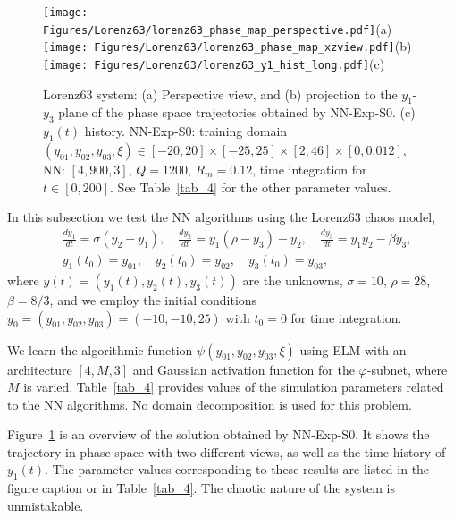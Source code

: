 \begin{figure}
  \centerline{
    \texttt{[image: Figures/Lorenz63/lorenz63\_phase\_map\_perspective.pdf]}(a)
    \texttt{[image: Figures/Lorenz63/lorenz63\_phase\_map\_xzview.pdf]}(b)
    \texttt{[image: Figures/Lorenz63/lorenz63\_y1\_hist\_long.pdf]}(c)
  }
  \caption{Lorenz63 system: (a) Perspective view, and (b) projection to the
    $y_1$-$y_3$ plane
    of the phase space trajectories obtained by NN-Exp-S0.
    (c) $y_1(t)$ history.
    NN-Exp-S0: training domain
    $(y_{01},y_{02},y_{03},\xi)\in[-20,20]\times[-25,25]\times[2,46]\times[0,0.012]$,
    NN: $[4,900,3]$, $Q=1200$, $R_m=0.12$, time integration for $t\in[0,200]$.
    See Table~\ref{tab_4} for the other parameter values.
  }
  \label{fg_21}
\end{figure}


In this subsection we test the NN algorithms using the Lorenz63 chaos model,
\begin{subequations}
\begin{align}
  & \frac{dy_1}{dt} = \sigma (y_2-y_1),\quad
   \frac{dy_2}{dt} = y_1(\rho-y_3) - y_2, \quad
   \frac{dy_3}{dt} = y_1y_2 - \beta y_3,\\
  & y_1(t_0)=y_{01}, \quad y_2(t_0) = y_{02}, \quad y_3(t_0) = y_{03},
\end{align}
\end{subequations}
where $y(t)=(y_1(t),y_2(t),y_3(t))$ are the unknowns,
$\sigma = 10$, $\rho=28$, $\beta=8/3$, and we employ the initial conditions
$y_0=(y_{01},y_{02},y_{03})=(-10,-10,25)$ with $t_0=0$ for time integration.


We learn the algorithmic function
$\psi(y_{01},y_{02},y_{03},\xi)$ using ELM with an
architecture $[4, M, 3]$ and Gaussian activation function
for the $\varphi$-subnet, where
$M$ is varied. Table~\ref{tab_4} provides values of the simulation
parameters related to the NN algorithms. No domain decomposition is used for
this problem.

Figure~\ref{fg_21} is an overview of the solution 
obtained by NN-Exp-S0. It shows the trajectory
in phase space with two different views, as well as the time history
of $y_1(t)$. The parameter values corresponding to these results
are listed in the figure caption or in Table~\ref{tab_4}.
The chaotic nature of the system is unmistakable.



